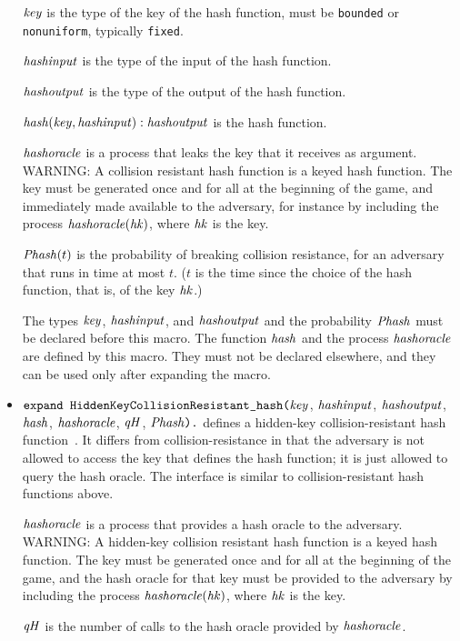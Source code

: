 \documentclass{article}
\begin{document}
\begin{itemize}
   $\mathit{key}$ is the type of the key of the hash function, must be \texttt{bounded} or \texttt{nonuniform}, typically \texttt{fixed}.

   $\mathit{hashinput}$ is the type of the input of the hash function.

   $\mathit{hashoutput}$ is the type of the output of the hash function.

   $\mathit{hash}(\mathit{key}, \mathit{hashinput}): \mathit{hashoutput}$ is the hash function.

   $\mathit{hashoracle}$ is a process that leaks the key that it receives as argument.
   WARNING: A collision resistant hash function is a keyed hash function.
   The key must be generated once and for all at the beginning of the game,
   and immediately made available to the adversary, for instance
   by including the process $\mathit{hashoracle}(\mathit{hk})$,
   where $\mathit{hk}$ is the key.

   $\mathit{Phash}(t)$ is the probability of breaking collision resistance,
   for an adversary that runs in time at most $t$. ($t$ is the time
   since the choice of the hash function, that is, of the key $\mathit{hk}$.)

   The types $\mathit{key}$, $\mathit{hashinput}$, and $\mathit{hashoutput}$ and
   the probability $\mathit{Phash}$ must be declared before this macro.
   The function $\mathit{hash}$ and the process $\mathit{hashoracle}$ are
   defined by this macro. They must not be declared elsewhere, and
   they can be used only after expanding the macro.

\item $\texttt{expand HiddenKeyCollisionResistant\_hash(}\mathit{key}$, $\mathit{hashinput}$, $\mathit{hashoutput}$, $\mathit{hash}$, $\mathit{hashoracle}$, $\mathit{qH}$, $\mathit{Phash}\texttt{).}$
defines a hidden-key collision-resistant hash function~\cite[Section~8.6]{BellareCourse}. It differs from collision-resistance in that the adversary is not allowed to access the key that defines the hash function; it is just allowed to query the hash oracle. The interface is similar to collision-resistant hash functions above. 

   $\mathit{hashoracle}$ is a process that provides a hash oracle to the adversary.
   WARNING: A hidden-key collision resistant hash function is a keyed hash function.
   The key must be generated once and for all at the beginning of the game,
   and the hash oracle for that key must be provided to the adversary
   by including the process $\mathit{hashoracle}(\mathit{hk})$,
   where $\mathit{hk}$ is the key.

   $\mathit{qH}$ is the number of calls to the hash oracle provided by $\mathit{hashoracle}$.


\end{itemize}
\end{document}
